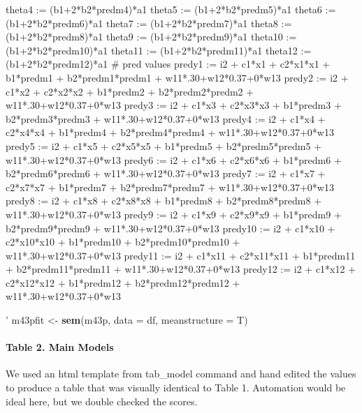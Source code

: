 \documentclass[
]{article}
\newenvironment{Shaded}{\begin{snugshade}}{\end{snugshade}}
\newcommand{\DataTypeTok}[1]{\textcolor[rgb]{0.13,0.29,0.53}{#1}}
\newcommand{\KeywordTok}[1]{\textcolor[rgb]{0.13,0.29,0.53}{\textbf{#1}}}
\newcommand{\NormalTok}[1]{#1}
\newcommand{\StringTok}[1]{\textcolor[rgb]{0.31,0.60,0.02}{#1}}
\begin{document}
\begin{Shaded}
\begin{Highlighting}[]
\StringTok{             theta4 := (b1+2*b2*predm4)*a1}
\StringTok{             theta5 := (b1+2*b2*predm5)*a1}
\StringTok{             theta6 := (b1+2*b2*predm6)*a1}
\StringTok{             theta7 := (b1+2*b2*predm7)*a1}
\StringTok{             theta8 := (b1+2*b2*predm8)*a1}
\StringTok{             theta9 := (b1+2*b2*predm9)*a1}
\StringTok{             theta10 := (b1+2*b2*predm10)*a1}
\StringTok{             theta11 := (b1+2*b2*predm11)*a1}
\StringTok{             theta12 := (b1+2*b2*predm12)*a1}
\StringTok{           # pred values}
\StringTok{             predy1 := i2 + c1*x1 + c2*x1*x1 + b1*predm1 + b2*predm1*predm1 + w11*.30+w12*0.37+0*w13}
\StringTok{             predy2 := i2 + c1*x2 + c2*x2*x2 + b1*predm2 + b2*predm2*predm2 + w11*.30+w12*0.37+0*w13}
\StringTok{             predy3 := i2 + c1*x3 + c2*x3*x3 + b1*predm3 + b2*predm3*predm3 + w11*.30+w12*0.37+0*w13}
\StringTok{             predy4 := i2 + c1*x4 + c2*x4*x4 + b1*predm4 + b2*predm4*predm4 + w11*.30+w12*0.37+0*w13}
\StringTok{             predy5 := i2 + c1*x5 + c2*x5*x5 + b1*predm5 + b2*predm5*predm5 + w11*.30+w12*0.37+0*w13}
\StringTok{             predy6 := i2 + c1*x6 + c2*x6*x6 + b1*predm6 + b2*predm6*predm6 + w11*.30+w12*0.37+0*w13}
\StringTok{             predy7 := i2 + c1*x7 + c2*x7*x7 + b1*predm7 + b2*predm7*predm7 + w11*.30+w12*0.37+0*w13}
\StringTok{             predy8 := i2 + c1*x8 + c2*x8*x8 + b1*predm8 + b2*predm8*predm8 + w11*.30+w12*0.37+0*w13}
\StringTok{             predy9 := i2 + c1*x9 + c2*x9*x9 + b1*predm9 + b2*predm9*predm9 + w11*.30+w12*0.37+0*w13}
\StringTok{             predy10 := i2 + c1*x10 + c2*x10*x10 + b1*predm10 + b2*predm10*predm10 + w11*.30+w12*0.37+0*w13}
\StringTok{             predy11 := i2 + c1*x11 + c2*x11*x11 + b1*predm11 + b2*predm11*predm11 + w11*.30+w12*0.37+0*w13}
\StringTok{             predy12 := i2 + c1*x12 + c2*x12*x12 + b1*predm12 + b2*predm12*predm12 + w11*.30+w12*0.37+0*w13}

\StringTok{         '}
\NormalTok{m43pfit <-}\StringTok{ }\KeywordTok{sem}\NormalTok{(m43p, }\DataTypeTok{data =}\NormalTok{ df, }\DataTypeTok{meanstructure =}\NormalTok{ T)}
\end{Highlighting}
\end{Shaded}

\hypertarget{table-2.-main-models}{%
\paragraph{Table 2. Main Models}\label{table-2.-main-models}}

We used an html template from tab\_model command and hand edited the
values to produce a table that was visually identical to Table 1.
Automation would be ideal here, but we double checked the scores.
\end{document}
